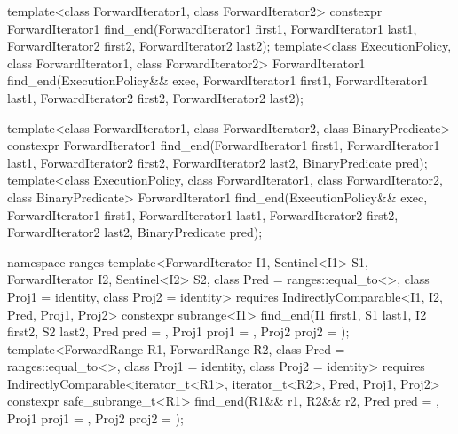 %
\begin{itemdecl}
template<class ForwardIterator1, class ForwardIterator2>
  constexpr ForwardIterator1
    find_end(ForwardIterator1 first1, ForwardIterator1 last1,
             ForwardIterator2 first2, ForwardIterator2 last2);
template<class ExecutionPolicy, class ForwardIterator1, class ForwardIterator2>
  ForwardIterator1
    find_end(ExecutionPolicy&& exec,
             ForwardIterator1 first1, ForwardIterator1 last1,
             ForwardIterator2 first2, ForwardIterator2 last2);

template<class ForwardIterator1, class ForwardIterator2,
         class BinaryPredicate>
  constexpr ForwardIterator1
    find_end(ForwardIterator1 first1, ForwardIterator1 last1,
             ForwardIterator2 first2, ForwardIterator2 last2,
             BinaryPredicate pred);
template<class ExecutionPolicy, class ForwardIterator1, class ForwardIterator2,
         class BinaryPredicate>
  ForwardIterator1
    find_end(ExecutionPolicy&& exec,
             ForwardIterator1 first1, ForwardIterator1 last1,
             ForwardIterator2 first2, ForwardIterator2 last2,
             BinaryPredicate pred);

namespace ranges {
  template<ForwardIterator I1, Sentinel<I1> S1, ForwardIterator I2, Sentinel<I2> S2,
           class Pred = ranges::equal_to<>, class Proj1 = identity, class Proj2 = identity>
    requires IndirectlyComparable<I1, I2, Pred, Proj1, Proj2>
    constexpr subrange<I1>
      find_end(I1 first1, S1 last1, I2 first2, S2 last2, Pred pred = {},
               Proj1 proj1 = {}, Proj2 proj2 = {});
  template<ForwardRange R1, ForwardRange R2,
           class Pred = ranges::equal_to<>, class Proj1 = identity, class Proj2 = identity>
    requires IndirectlyComparable<iterator_t<R1>, iterator_t<R2>, Pred, Proj1, Proj2>
    constexpr safe_subrange_t<R1>
      find_end(R1&& r1, R2&& r2, Pred pred = {},
               Proj1 proj1 = {}, Proj2 proj2 = {});
}
\end{itemdecl}


